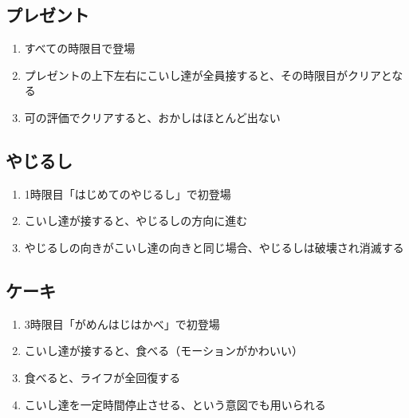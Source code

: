 \subsection{プレゼント}
\begin{enumerate}[label={\sarrow}]
\item すべての時限目で登場
\item プレゼントの上下左右にこいし達が全員接すると、その時限目がクリアとなる
\item 可の評価でクリアすると、おかしはほとんど出ない
\end{enumerate}


\subsection{やじるし}
\begin{enumerate}[label={\sarrow}]
\item 1時限目「はじめてのやじるし」で初登場
\item こいし達が接すると、やじるしの方向に進む
\item やじるしの向きがこいし達の向きと同じ場合、やじるしは破壊され消滅する
\end{enumerate}


\subsection{ケーキ}
\begin{enumerate}[label={\sarrow}]
\item 3時限目「がめんはじはかべ」で初登場
\item こいし達が接すると、食べる（モーションがかわいい）
\item 食べると、ライフが全回復する
\item こいし達を一定時間停止させる、という意図でも用いられる
\end{enumerate}


